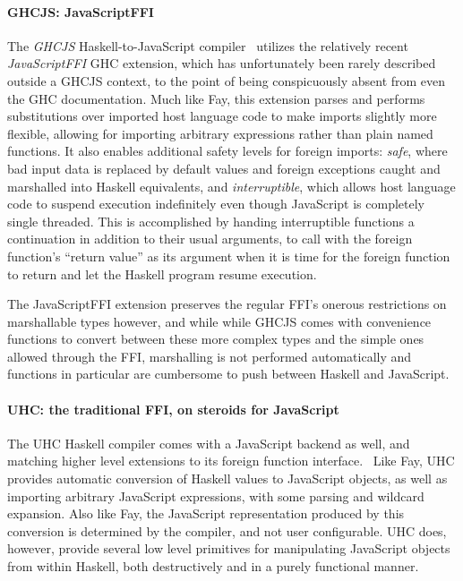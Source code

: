 \documentclass{sigplanconf}
\begin{document}
\paragraph{GHCJS: JavaScriptFFI}
The \emph{GHCJS} Haskell-to-JavaScript compiler\ \cite{ghcjs} utilizes the
relatively recent \emph{JavaScriptFFI} GHC extension,
which has unfortunately been rarely described outside a GHCJS context, to the
point of being conspicuously absent from even the GHC documentation.
Much like Fay, this extension parses and
performs substitutions over imported host language code to make imports
slightly more flexible, allowing for importing arbitrary expressions rather
than plain named functions.
It also enables additional safety levels for foreign
imports: \emph{safe}, where bad input data is replaced by default values and
foreign exceptions caught and marshalled into Haskell equivalents,
and \emph{interruptible}, which allows host language code to suspend execution
indefinitely even though JavaScript is completely single threaded.
This is accomplished by handing interruptible functions a continuation in
addition to their usual arguments, to call with the foreign function's
``return value'' as its argument when it is time for the foreign function
to return and let the Haskell program resume execution.

The JavaScriptFFI extension preserves the regular FFI's onerous restrictions
on marshallable types however, and while while GHCJS comes with convenience
functions to convert between these more complex types and the simple ones
allowed through the FFI, marshalling is not performed automatically and
functions in particular are cumbersome to push between Haskell and JavaScript.

\paragraph{UHC: the traditional FFI, on steroids for JavaScript}
The UHC Haskell compiler comes with a JavaScript backend as well, and matching
higher level extensions to its foreign function interface.\ \cite{uhc}
Like Fay, UHC provides automatic conversion of Haskell values to JavaScript
objects, as well as importing arbitrary JavaScript expressions, with some
parsing and wildcard expansion.
Also like Fay, the JavaScript representation produced by this
conversion is determined by the compiler, and not user configurable.
UHC does, however, provide several low level primitives for manipulating
JavaScript objects from within Haskell, both destructively and in a purely
functional manner.
\end{document}
